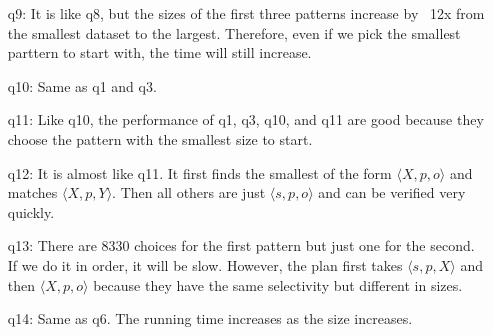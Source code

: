 \documentclass{article}
\begin{document}
\begin{enumerate}
\begin{enumerate}
\item[q9:] It is like q8, but the sizes of the first three patterns increase by ~12x from the smallest dataset to the largest. Therefore, even if we pick the smallest parttern to start with, the time will still increase. 
\item[q10:] Same as q1 and q3. 
\item[q11:] Like q10, the performance of q1, q3, q10, and q11 are good because they choose the pattern with the smallest size to start.
\item[q12:] It is almost like q11. It first finds the smallest of the form $\langle X, p, o\rangle$ and matches $\langle X, p, Y\rangle$. Then all others are just $\langle s, p, o\rangle$ and can be verified very quickly. 
\item[q13:] There are 8330 choices for the first pattern but just one for the second. If we do it in order, it will be slow. However, the plan first takes $\langle s, p, X\rangle$ and then $\langle X, p, o\rangle$ because they have the same selectivity but different in sizes.
\item[q14:] Same as q6. The running time increases as the size increases. 
\end{enumerate}
\end{enumerate}
\end{document}

